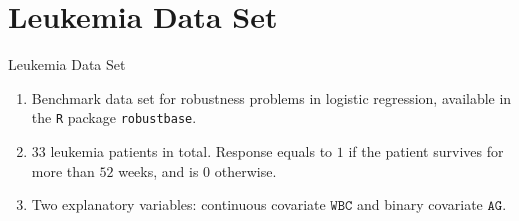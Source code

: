 \documentclass{beamer}
\begin{document}
\section{Leukemia Data Set}

\begin{frame}
    \tableofcontents[currentsection]
\end{frame}

\begin{frame}{Leukemia Data Set}
    \begin{enumerate}
    \item Benchmark data set for robustness problems in logistic regression,
    available in the \texttt{R} package \texttt{robustbase}.
    \item $33$ leukemia patients in total. 
    Response equals to $1$ if the patient survives for more than $52$ weeks,
    and is $0$ otherwise.
    \item Two explanatory variables: continuous covariate $\texttt{WBC}$ and binary covariate $\texttt{AG}$.
    \end{enumerate}
\end{frame}
\end{document}
